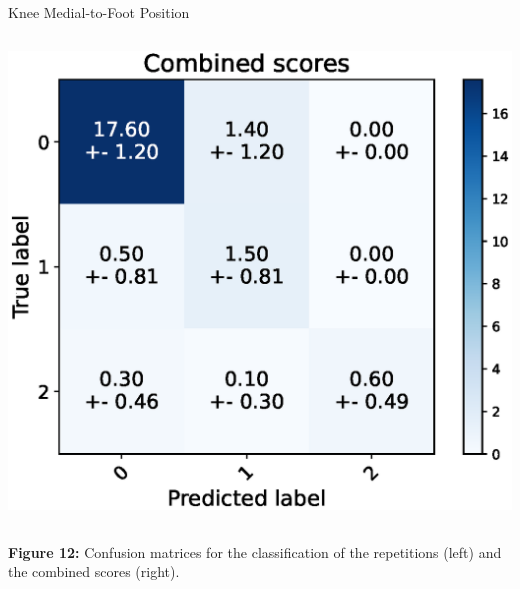 \begin{frame}[fragile]{Knee Medial-to-Foot Position}
\begin{columns}
    \includegraphics[width=\textwidth]{files/figs/res/kmfp/cnf-combined.eps}
  \end{columns}
  {\scriptsize\newline\textbf{Figure 12:} Confusion matrices for the classification of the repetitions (left) and the combined scores (right).}
\end{frame}

